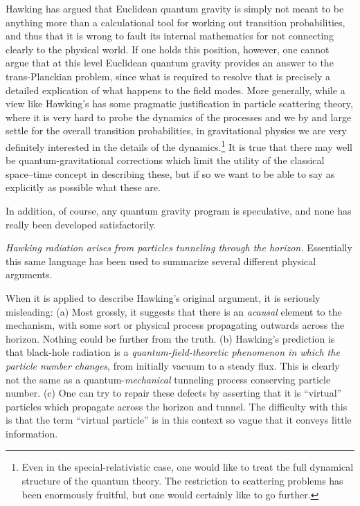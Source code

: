 \documentclass[12pt]{article}
\begin{document}
Hawking \citep{Hawking:1996jh} has argued that Euclidean quantum gravity is simply not meant to be anything more than a calculational tool for working out transition probabilities, and thus that it is wrong to fault its internal mathematics for not connecting clearly to the physical world.  If one holds this position, however, one cannot argue that at this level Euclidean quantum gravity provides an answer to the trans-Planckian problem, since what is required to resolve that is precisely a detailed explication of what happens to the field modes. 
More generally, while a view like Hawking's has some pragmatic justification
in particle scattering theory, where it is very hard to probe the dynamics of the processes and we by and large settle for the overall transition probabilities, in gravitational physics we are very definitely interested in the details of the dynamics.\footnote{Even in the special-relativistic case, one would like to treat the full dynamical structure of the quantum theory.  The restriction to scattering problems has been enormously fruitful, but one would certainly like to go further.}  It is true that there may well be quantum-gravitational corrections which limit the utility of the classical space--time concept in describing these, but if so we want to be able to say as explicitly as possible what these are.  

In addition, of course, any quantum gravity program is speculative, and none has really been developed satisfactorily.



{\em Hawking radiation arises from particles tunneling through the horizon.}
Essentially this same language has been used to summarize several different physical arguments.

When it is applied to describe Hawking's original argument, it is seriously misleading:
(a) Most grossly, it suggests that there is an {\em acausal} element to the mechanism, with some sort or physical process
propagating outwards across the horizon.  Nothing could be
further from the truth.
(b) Hawking's prediction is that black-hole radiation is a {\em quantum-field-theoretic phenomenon in which the particle number changes}, from initially vacuum to a steady flux.  This is clearly not the same as a quantum-{\em mechanical} tunneling process conserving particle number.
(c) One can try to repair these defects by asserting that it is ``virtual'' particles which propagate across the horizon and tunnel.  The difficulty with this is that the term ``virtual particle'' is in this context so vague that it conveys little information.
\end{document}

